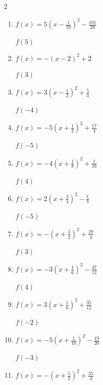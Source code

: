 \begin{multicols}{2}
\begin{enumerate}
$f(1)$
        \phantom{$=-3$}

  \item $\displaystyle f(x)=5\left( x-\frac{1}{10}\right)^{2}-\frac{101}{20}$

$f(5)$
        \phantom{$=115$}

  \item $\displaystyle f(x)=-\left( x-2\right)^{2}+2$

$f(3)$
        \phantom{$=1$}

  \item $\displaystyle f(x)=3\left( x-\frac{1}{2}\right)^{2}+\frac{5}{4}$

$f(-4)$
        \phantom{$=62$}

  \item $\displaystyle f(x)=-5\left( x+\frac{1}{2}\right)^{2}+\frac{17}{4}$

$f(-5)$
        \phantom{$=-97$}

\columnbreak %

  \item $\displaystyle f(x)=-4\left( x+\frac{1}{8}\right)^{2}+\frac{1}{16}$

$f(4)$
        \phantom{$=-68$}

  \item $\displaystyle f(x)=2\left( x+\frac{3}{4}\right)^{2}-\frac{1}{8}$

$f(-5)$
        \phantom{$=36$}

  \item $\displaystyle f(x)=-\left( x+\frac{3}{2}\right)^{2}+\frac{29}{4}$

$f(3)$
        \phantom{$=-13$}

  \item $\displaystyle f(x)=-3\left( x+\frac{1}{6}\right)^{2}-\frac{47}{12}$

$f(4)$
        \phantom{$=-56$}

  \item $\displaystyle f(x)=3\left( x+\frac{1}{6}\right)^{2}+\frac{35}{12}$

$f(-2)$
        \phantom{$=13$}

\columnbreak %

\resetques

  \item $\displaystyle f(x)=-5\left( x+\frac{1}{10}\right)^{2}-\frac{19}{20}$

$f(-3)$
        \phantom{$=-43$}

  \item $\displaystyle f(x)=-\left( x+\frac{5}{2}\right)^{2}+\frac{25}{4}$


\end{enumerate}
\end{multicols}
